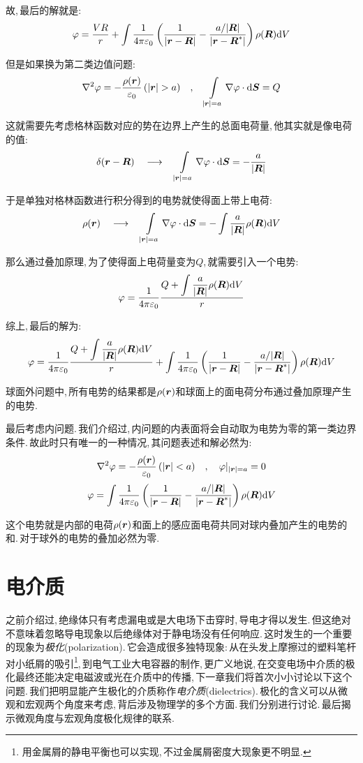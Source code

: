 故,\,最后的解就是:
\[\varphi=\frac{VR}{r}+\int \frac{1}{4\pi\varepsilon_0} \left(\frac{1}{|\boldsymbol{r}-\boldsymbol{R}|}-\frac{a/|\boldsymbol{R}|}{|\boldsymbol{r}-\boldsymbol{R}^\ast|}\right)\rho(\boldsymbol{R})\textrm{d} V\]

但是如果换为第二类边值问题:
\[\nabla^2\varphi = -\frac{\rho(\bs{r})}{\varepsilon_0}\,(|\bs{r}|>a)\quad ,\quad \int\limits_{|\bs{r}|=a}\nabla\varphi\cdot \ud \bs{S}=Q\]

这就需要先考虑格林函数对应的势在边界上产生的总面电荷量,\,他其实就是像电荷的值:
\[\delta(\boldsymbol{r}-\boldsymbol{R})\quad \longrightarrow\quad  \int\limits_{|\boldsymbol{r}|=a}\nabla\varphi\cdot \textrm{d} \boldsymbol{S}=-\frac{a}{|\boldsymbol{R}|}\]

于是单独对格林函数进行积分得到的电势就使得面上带上电荷:
\[\rho(\boldsymbol{r})\quad \longrightarrow\quad \int\limits_{|\boldsymbol{r}|=a}\nabla\varphi\cdot \textrm{d} \boldsymbol{S}=-\int \frac{a}{|\boldsymbol{R}|}\rho(\boldsymbol{R})\textrm{d} V\]

那么通过叠加原理,\,为了使得面上电荷量变为$Q$,\,就需要引入一个电势:
\[\varphi=\frac{1}{4\pi\varepsilon_0} \frac{Q+\displaystyle\int \frac{a}{|\boldsymbol{R}|}\rho(\boldsymbol{R})\textrm{d} V}{r}\]

综上,\,最后的解为:
\[\varphi =\frac{1}{4\pi\varepsilon_0} \frac{Q+\displaystyle\int \frac{a}{|\boldsymbol{R}|}\rho(\boldsymbol{R})\textrm{d} V}{r}+\int \frac{1}{4\pi\varepsilon_0} \left(\frac{1}{|\boldsymbol{r}-\boldsymbol{R}|}-\frac{a/|\boldsymbol{R}|}{|\boldsymbol{r}-\boldsymbol{R}^\ast|}\right)\rho(\boldsymbol{R})\textrm{d} V \]

球面外问题中,\,所有电势的结果都是$\rho(\boldsymbol{r})$和球面上的面电荷分布通过叠加原理产生的电势.

最后考虑内问题.\,我们介绍过,\,内问题的内表面将会自动取为电势为零的第一类边界条件.\,故此时只有唯一的一种情况,\,其问题表述和解必然为:
\[\nabla^2\varphi = -\frac{\rho(\boldsymbol{r})}{\varepsilon_0}\,(|\boldsymbol{r}|<a)\quad ,\quad \varphi|_{|\boldsymbol{r}|=a}=0\]
\[\varphi=\int \frac{1}{4\pi\varepsilon_0} \left(\frac{1}{|\boldsymbol{r}-\boldsymbol{R}|}-\frac{a/|\boldsymbol{R}|}{|\boldsymbol{r}-\boldsymbol{R}^\ast|}\right)\rho(\boldsymbol{R})\textrm{d} V\]

这个电势就是内部的电荷$\rho(\boldsymbol{r})$和面上的感应面电荷共同对球内叠加产生的电势的和.\,对于球外的电势的叠加必然为零.


\section{电介质}

之前介绍过,\,绝缘体只有考虑漏电或是大电场下击穿时,\,导电才得以发生.\,但这绝对不意味着忽略导电现象以后绝缘体对于静电场没有任何响应.\,这时发生的一个重要的现象为\emph{极化}(polarization).\,它会造成很多独特现象:\,从在头发上摩擦过的塑料笔杆对小纸屑的吸引\footnote{用金属屑的静电平衡也可以实现,\,不过金属屑密度大现象更不明显.},\,到电气工业大电容器的制作,\,更广义地说,\,在交变电场中介质的极化最终还能决定电磁波或光在介质中的传播,\,下一章我们将首次小小讨论以下这个问题.\,我们把明显能产生极化的介质称作\emph{电介质}(dielectrics).\,极化的含义可以从微观和宏观两个角度来考虑,\,背后涉及物理学的多个方面.\,我们分别进行讨论.\,最后揭示微观角度与宏观角度极化规律的联系.\,

